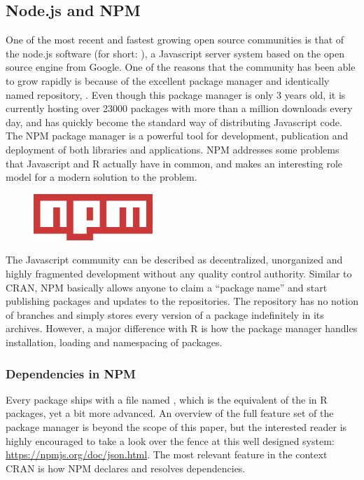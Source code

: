 \subsection{Node.js and NPM}

One of the most recent and fastest growing open source communities is that of
the node.js software (for short: ), a Javascript server system based
on the open source engine  from Google. One of the reasons that the
community has been able to grow rapidly is because of the excellent package
manager and identically named repository, . Even though this package
manager is only 3 years old, it is currently hosting over 23000 packages with
more than a million downloads every day, and has quickly become the standard
way of distributing Javascript code. The NPM package manager is a powerful tool
for development, publication and deployment of both libraries and applications.
NPM addresses some problems that Javascript and R actually have in common, and
makes an interesting role model for a modern solution to the problem.\\

\begin{figure}[placement specifier]
\centering
\includegraphics[width=0.4\textwidth]{npm}
\end{figure}

\noindent The Javascript community can be described as decentralized,
unorganized and highly fragmented development without any quality control authority. Similar to
CRAN, NPM basically allows anyone to claim a ``package name'' and start
publishing packages and updates to the repositories. The repository has no
notion of branches and simply stores every version of a package indefinitely in
its archives. However, a major difference with R is how the package manager
handles installation, loading and namespacing of packages.

\subsubsection{Dependencies in NPM}

Every  package ships with a file named , which is
the equivalent of the  in R packages, yet a bit more advanced.
An overview of the full feature set of the package manager is beyond the scope
of this paper, but the interested reader is highly encouraged to take a look
over the fence at this well designed system: \url{https://npmjs.org/doc/json.html}.
The most relevant feature in the context CRAN is how NPM declares and resolves
dependencies.

